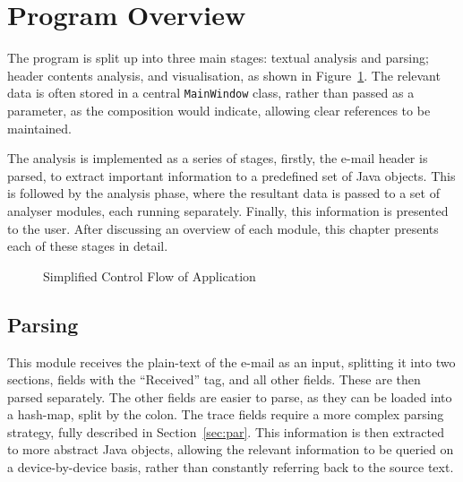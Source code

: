 \section{Program Overview}

The program is split up into three main stages: textual analysis and parsing;
header contents analysis, and visualisation, as shown in Figure~\ref{fig:con}.
The relevant data is often stored in a central \texttt{MainWindow} class,
rather than passed as a parameter, as the composition would indicate, allowing
clear references to be maintained.

The  analysis is implemented as a series of stages, firstly, the e-mail header
is parsed, to extract important information to a predefined set of Java objects.
This is followed by the analysis phase, where the resultant data is passed to a
set of analyser modules, each running separately.  Finally, this information is
presented to the user.  After discussing an overview of each module, this chapter 
presents each of these stages in detail.

\begin{figure}
	\centering
{}
\caption{Simplified Control Flow of Application}
\label{fig:con}
\end{figure}

\subsection{Parsing}

This module receives the plain-text of the e-mail as an input, splitting it
into two sections, fields with the ``Received'' tag, and all other fields.
These are then parsed separately.  The other fields are easier to parse, as
they can be loaded into a hash-map, split by the colon.  The trace fields
require a more complex parsing strategy, fully described in
Section~\ref{sec:par}.  This information is then extracted to more abstract
Java objects, allowing the relevant information to be queried on a
device-by-device basis, rather than constantly referring back to the source
text.

